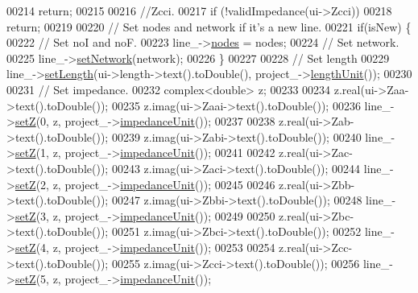 \begin{DoxyCode}
00214     \textcolor{keywordflow}{return};
00215 
00216   \textcolor{comment}{//Zcci.}
00217   \textcolor{keywordflow}{if} (!validImpedance(ui->Zcci))
00218     \textcolor{keywordflow}{return};
00219 
00220   \textcolor{comment}{// Set nodes and network if it's a new line.}
00221   \textcolor{keywordflow}{if}(isNew) \{
00222     \textcolor{comment}{// Set noI and noF.}
00223     line\_->\hyperlink{class_line_afd17c40d656e6a8d677cb22df5f0c70b}{nodes} = nodes;
00224     \textcolor{comment}{// Set network.}
00225     line\_->\hyperlink{group___models_ga320766e09f0ea36b2dd07d3b1db1b72e}{setNetwork}(network);
00226   \}
00227 
00228   \textcolor{comment}{// Set length}
00229   line\_->\hyperlink{group___models_ga950d0b8f5d167eda430c65ca7adadbb0}{setLength}(ui->length->text().toDouble(), project\_->\hyperlink{class_project_a40cd2f59a4a708897e5997942c046f4d}{lengthUnit}());
00230 
00231   \textcolor{comment}{// Set impedance.}
00232   complex<double> z;
00233 
00234   z.real(ui->Zaa->text().toDouble());
00235   z.imag(ui->Zaai->text().toDouble());
00236   line\_->\hyperlink{group___models_ga2b8fe47ae4ae2d4422d9431e17b4927d}{setZ}(0, z, project\_->\hyperlink{class_project_ad0725b9aa4445dd6d21d4e15df482d3b}{impedanceUnit}());
00237 
00238   z.real(ui->Zab->text().toDouble());
00239   z.imag(ui->Zabi->text().toDouble());
00240   line\_->\hyperlink{group___models_ga2b8fe47ae4ae2d4422d9431e17b4927d}{setZ}(1, z, project\_->\hyperlink{class_project_ad0725b9aa4445dd6d21d4e15df482d3b}{impedanceUnit}());
00241 
00242   z.real(ui->Zac->text().toDouble());
00243   z.imag(ui->Zaci->text().toDouble());
00244   line\_->\hyperlink{group___models_ga2b8fe47ae4ae2d4422d9431e17b4927d}{setZ}(2, z, project\_->\hyperlink{class_project_ad0725b9aa4445dd6d21d4e15df482d3b}{impedanceUnit}());
00245 
00246   z.real(ui->Zbb->text().toDouble());
00247   z.imag(ui->Zbbi->text().toDouble());
00248   line\_->\hyperlink{group___models_ga2b8fe47ae4ae2d4422d9431e17b4927d}{setZ}(3, z, project\_->\hyperlink{class_project_ad0725b9aa4445dd6d21d4e15df482d3b}{impedanceUnit}());
00249 
00250   z.real(ui->Zbc->text().toDouble());
00251   z.imag(ui->Zbci->text().toDouble());
00252   line\_->\hyperlink{group___models_ga2b8fe47ae4ae2d4422d9431e17b4927d}{setZ}(4, z, project\_->\hyperlink{class_project_ad0725b9aa4445dd6d21d4e15df482d3b}{impedanceUnit}());
00253 
00254   z.real(ui->Zcc->text().toDouble());
00255   z.imag(ui->Zcci->text().toDouble());
00256   line\_->\hyperlink{group___models_ga2b8fe47ae4ae2d4422d9431e17b4927d}{setZ}(5, z, project\_->\hyperlink{class_project_ad0725b9aa4445dd6d21d4e15df482d3b}{impedanceUnit}());

\end{DoxyCode}
